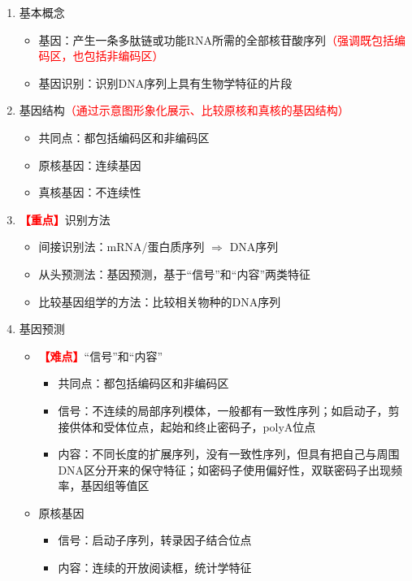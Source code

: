 \documentclass{TIJMUjiaoanLL}
\begin{document}
\begin{enumerate}
  \item 基本概念
    \begin{itemize}
      \item 基因：产生一条多肽链或功能RNA所需的全部核苷酸序列\textcolor{red}{（强调既包括编码区，也包括非编码区）}
      \item 基因识别：识别DNA序列上具有生物学特征的片段
    \end{itemize}
  \item 基因结构\textcolor{red}{（通过示意图形象化展示、比较原核和真核的基因结构）}
    \begin{itemize}
      \item 共同点：都包括编码区和非编码区
      \item 原核基因：连续基因
      \item 真核基因：不连续性
    \end{itemize}
  \item \textcolor{red}{\textbf{【重点】}}识别方法
    \begin{itemize}
      \item 间接识别法：mRNA/蛋白质序列 $\Rightarrow$ DNA序列
      \item 从头预测法：基因预测，基于“信号”和“内容”两类特征
      \item 比较基因组学的方法：比较相关物种的DNA序列
    \end{itemize}
  \item 基因预测
    \begin{itemize}
      \item \textcolor{red}{\textbf{【难点】}}“信号”和“内容”
	\begin{itemize}
      \item 共同点：都包括编码区和非编码区
	  \item 信号：不连续的局部序列模体，一般都有一致性序列；如启动子，剪接供体和受体位点，起始和终止密码子，polyA位点
	  \item 内容：不同长度的扩展序列，没有一致性序列，但具有把自己与周围DNA区分开来的保守特征；如密码子使用偏好性，双联密码子出现频率，基因组等值区
	\end{itemize}
      \item 原核基因
	\begin{itemize}
	  \item 信号：启动子序列，转录因子结合位点
	  \item 内容：连续的开放阅读框，统计学特征

\end{itemize}
\end{itemize}
\end{enumerate}
\end{document}
